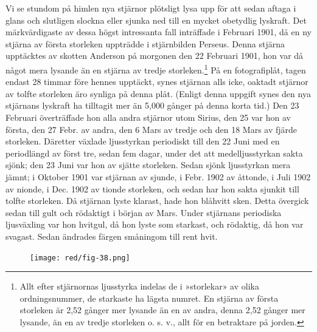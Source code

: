 \documentclass[a4paper, 12pt, oneside, swedish]{article}
\begin{document}
Vi se stundom på himlen nya stjärnor plötsligt lysa upp för att sedan aftaga i glans och slutligen slockna eller sjunka ned till en mycket obetydlig lyskraft. Det märkvärdigaste av dessa högst intressanta fall inträffade i Februari 1901, då en ny stjärna av första storleken uppträdde i stjärnbilden Perseus. Denna stjärna upptäcktes av skotten Anderson på morgonen den 22 Februari 1901, hon var då något mera lysande än en stjärna av tredje storleken.\footnote{Allt efter stjärnornas ljusstyrka indelas de i »storlekar» av olika ordningsnummer, de starkaste ha lägsta numret. En stjärna av första storleken är 2,52 gånger mer lysande än en av andra, denna 2,52 gånger mer lysande, än en av tredje storleken o. s. v., allt för en betraktare på jorden.} På en fotografiplåt, tagen endast 28 timmar före hennes upptäckt, synes stjärnan alls icke, oaktadt stjärnor av tolfte storleken äro synliga på denna plåt. (Enligt denna uppgift synes den nya stjärnans lyskraft ha tilltagit mer än 5,000 gånger på denna korta tid.) Den 23 Februari överträffade hon alla andra stjärnor utom Sirius, den 25 var hon av första, den 27 Febr. av andra, den 6 Mars av tredje och den 18 Mars av fjärde storleken. Däretter växlade ljusstyrkan periodiskt till den 22 Juni med en periodlängd av först tre, sedan fem dagar, under det att medelljusstyrkan sakta sjönk; den 23 Juni var hon av sjätte storleken. Sedan sjönk ljusstyrkan mera jämnt; i Oktober 1901 var stjärnan av sjunde, i Febr. 1902 av åttonde, i Juli 1902 av nionde, i Dec. 1902 av tionde storleken, och sedan har hon sakta sjunkit till tolfte storleken. Då stjärnan lyste klarast, hade hon blåhvitt sken. Detta övergick sedan till gult och rödaktigt i början av Mars. Under stjärnans periodiska ljusväxling var hon hvitgul, då hon lyste som starkast, och rödaktig, då hon var svagast. Sedan ändrades färgen småningom till rent hvit.

\begin{figure}[H]
\centering
\texttt{[image: red/fig-38.png]}
\caption{}
\end{figure}
\end{document}
